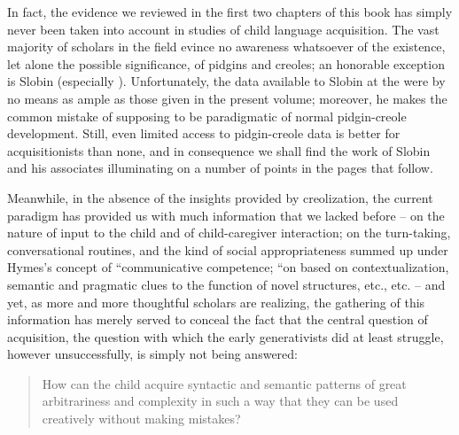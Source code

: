 In fact, the evidence we reviewed in the first two chapters of this book has simply never been taken into account in studies of child language acquisition. The vast majority of scholars in the field evince no awareness whatsoever of the existence, let alone the possible significance, of pidgins and creoles; an honorable exception is Slobin (especially \citealt{Slobin1977}). Unfortunately, the data available to Slobin at the  were by no means as ample as those given in the present volume; moreover, he makes the common mistake of supposing  to be paradigmatic of normal pidgin-creole development. Still, even limited access to pidgin-creole data is better for acquisitionists than none, and in consequence we shall find the work of Slobin and his associates illuminating on a number of points in the pages that follow.

Meanwhile, in the absence of the insights provided by creolization, the current paradigm has provided us with much information that we lacked before -- on the nature of input to the child and of child-caregiver interaction; on the  turn-taking, conversational routines, and the kind of social appropriateness summed up under Hymes's concept of ``communicative competence; ``on  based on contextualization, semantic and pragmatic clues to the function of novel structures, etc., etc. -- and yet, as more and more thoughtful scholars are realizing, the gathering of this information has merely served to conceal the fact that the central question of acquisition, the question with which the early generativists did at least struggle, however unsuccessfully, is simply not being answered:

\begin{quote}
How can the child acquire syntactic and semantic patterns of great arbitrariness and complexity in such a way that they can be used creatively without making mistakes?
\end{quote}

